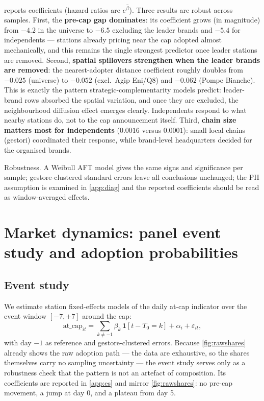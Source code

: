 \documentclass[11pt]{article}
\begin{document}
 reports coefficients (hazard ratios are
$e^{\hat\beta}$). Three results are robust across samples. First, the
\textbf{pre-cap gap dominates}: its coefficient grows (in magnitude) from
$-4.2$ in the universe to $-6.5$ excluding the leader brands and
$-5.4$ for independents --- stations already pricing near the cap adopted
almost mechanically, and this remains the single strongest predictor
once leader stations are removed. Second, \textbf{spatial spillovers
strengthen when the leader brands are removed}: the nearest-adopter
distance coefficient roughly doubles from $-0.025$ (universe) to
$-0.052$ (excl.\ Agip Eni/Q8) and $-0.062$ (Pompe Bianche). This is exactly the
pattern strategic-complementarity models predict: leader-brand rows
absorbed the spatial variation, and once they are excluded, the
neighbourhood diffusion effect emerges clearly. Independents respond to
what nearby stations do, not to the cap announcement itself. Third,
\textbf{chain size matters most for independents} ($0.0016$ versus
$0.0001$): small local chains (gestori) coordinated their response,
while brand-level headquarters decided for the organised brands.

Robustness. A Weibull AFT model gives the same signs and significance
per sample; gestore-clustered standard errors leave all conclusions
unchanged; the PH assumption is examined in \cref{app:diag} and the
reported coefficients should be read as window-averaged effects.

\section{Market dynamics: panel event study and adoption probabilities}
\label{sec:panel}

\subsection{Event study}

We estimate station fixed-effects models of the daily at-cap indicator
over the event window $[-7, +7]$ around the cap:
\begin{equation}
\text{at\_cap}_{it} = \sum_{k \ne -1} \beta_k \,
\mathbf{1}[t - T_0 = k] + \alpha_i + \varepsilon_{it},
\label{eq:es}
\end{equation}
with day $-1$ as reference and gestore-clustered errors. Because
\cref{fig:rawshares} already shows the raw adoption path --- the data are
exhaustive, so the shares themselves carry no sampling uncertainty ---
the event study serves only as a robustness check that the pattern is
not an artefact of composition. Its coefficients are reported in
\cref{app:es} and mirror \cref{fig:rawshares}: no pre-cap movement, a
jump at day 0, and a plateau from day 5.
\end{document}

